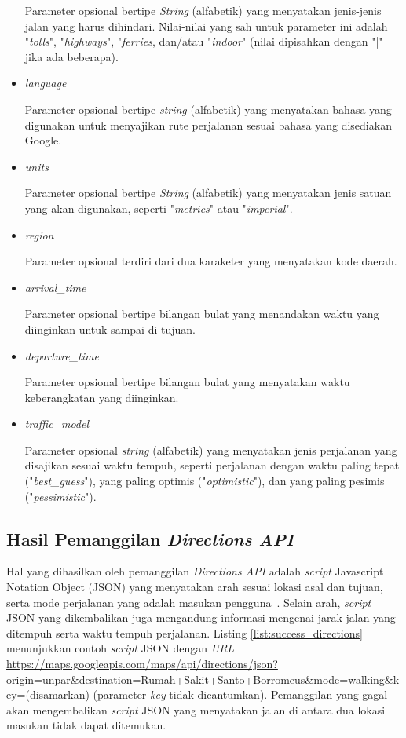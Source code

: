 \begin{itemize}
	Parameter opsional bertipe \textit{String} (alfabetik) yang menyatakan jenis-jenis jalan yang harus dihindari. Nilai-nilai yang sah untuk parameter ini adalah "\textit{tolls}", "\textit{highways}", "\textit{ferries}, dan/atau "\textit{indoor}" (nilai dipisahkan dengan "|" jika ada beberapa).
	\item \textit{language}
	
	Parameter opsional bertipe \textit{string} (alfabetik) yang menyatakan bahasa yang digunakan untuk menyajikan rute perjalanan sesuai bahasa yang disediakan Google. 
	\item \textit{units}
	
	Parameter opsional bertipe \textit{String} (alfabetik) yang menyatakan jenis satuan yang akan digunakan, seperti "\textit{metrics}" atau "\textit{imperial}".
	\item \textit{region}
	
	Parameter opsional terdiri dari dua karaketer yang menyatakan kode daerah.
	\item \textit{arrival\_time} 
	
	Parameter opsional bertipe bilangan bulat yang menandakan waktu yang diinginkan untuk sampai di tujuan.
	\item \textit{departure\_time} 
	
	Parameter opsional bertipe bilangan bulat yang menyatakan waktu keberangkatan yang diinginkan.
	\item \textit{traffic\_model}
	
	Parameter opsional \textit{string} (alfabetik) yang menyatakan jenis perjalanan yang disajikan sesuai waktu tempuh, seperti perjalanan dengan waktu paling tepat ("\textit{best\_guess}"), yang paling optimis ("\textit{optimistic}"), dan yang paling pesimis ("\textit{pessimistic}").
	
\end{itemize}


\subsection{Hasil Pemanggilan \textit{Directions API}}
Hal yang dihasilkan oleh pemanggilan \textit{Directions API} adalah \textit{script} Javascript Notation Object (JSON) yang menyatakan arah sesuai lokasi asal dan tujuan, serta mode perjalanan yang adalah masukan pengguna~\cite{directions-api}. Selain arah, \textit{script} JSON yang dikembalikan juga mengandung informasi mengenai jarak jalan yang ditempuh serta waktu tempuh perjalanan. Listing \ref{list:success_directions} menunjukkan contoh \textit{script} JSON dengan \textit{URL} \url{https://maps.googleapis.com/maps/api/directions/json?origin=unpar&destination=Rumah+Sakit+Santo+Borromeus&mode=walking&key=(disamarkan)} (parameter \textit{key} tidak dicantumkan). Pemanggilan yang gagal akan mengembalikan \textit{script} JSON yang menyatakan jalan di antara dua lokasi masukan tidak dapat ditemukan.


